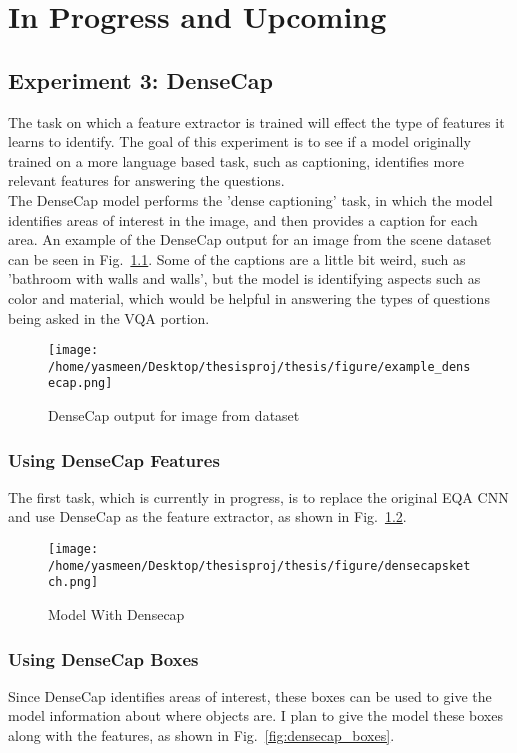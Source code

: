 \chapter{In Progress and Upcoming}
\section{Experiment 3: DenseCap}
The task on which a feature extractor is trained will effect the type of features it learns to identify. The goal of this experiment is to see if a model originally trained on a more language based task, such as captioning, identifies more relevant features for answering the questions. \\
The DenseCap model performs the 'dense captioning' task, in which the model identifies areas of interest in the image, and then provides a caption for each area\cite{densecap}. An example of the DenseCap output for an image from the scene dataset can be seen in Fig.~\ref{fig:example_densecap}. Some of the captions are a little bit weird, such as 'bathroom with walls and walls', but the model is identifying aspects such as color and material, which would be helpful in answering the types of questions being asked in the VQA portion. 

\begin{figure}[h]
     \centering
     \texttt{[image: /home/yasmeen/Desktop/thesisproj/thesis/figure/example\_densecap.png]}
     \caption{DenseCap output for image from dataset}
     \label{fig:example_densecap}
\end{figure}


\subsection{Using DenseCap Features}
The first task, which is currently in progress, is to replace the original EQA CNN and use DenseCap as the feature extractor, as shown in Fig.~\ref{fig:densecap_feats}.

\begin{figure}[h]
     \centering
     \texttt{[image: /home/yasmeen/Desktop/thesisproj/thesis/figure/densecapsketch.png]}
     \caption{Model With Densecap}
     \label{fig:densecap_feats}
\end{figure}


\subsection{Using DenseCap Boxes}
Since DenseCap identifies areas of interest, these boxes can be used to give the model information about where objects are. I plan to give the model these boxes along with the features, as shown in Fig.~\ref{fig:densecap_boxes}. 

